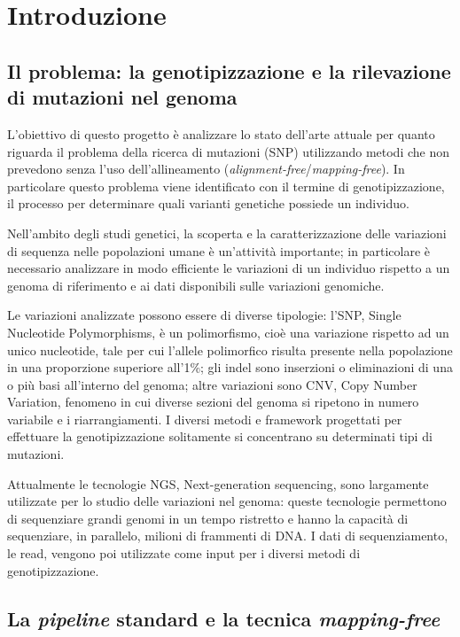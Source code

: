 \documentclass[../main.tex]{subfiles}
\begin{document}
\section{Introduzione}

\subsection{Il problema: la genotipizzazione e la rilevazione di mutazioni nel genoma}

L'obiettivo di questo progetto è analizzare lo stato dell'arte attuale per quanto riguarda il problema della ricerca di mutazioni (SNP) utilizzando metodi che non prevedono senza l'uso dell'allineamento (\textit{alignment-free}/\textit{mapping-free}). In particolare questo problema viene identificato con il termine di genotipizzazione, il processo per determinare quali varianti genetiche possiede un individuo.


Nell'ambito degli studi genetici, la scoperta e la caratterizzazione delle variazioni di sequenza nelle popolazioni umane è un'attività importante; in particolare è necessario analizzare in modo efficiente le variazioni di un individuo rispetto a un genoma di riferimento e ai dati disponibili sulle variazioni genomiche. 


Le variazioni analizzate possono essere di diverse tipologie: l'SNP, Single Nucleotide Polymorphisms, è un polimorfismo, cioè una variazione rispetto ad un unico nucleotide, tale per cui l'allele polimorfico risulta presente nella popolazione in una proporzione superiore all'1\%; gli indel sono inserzioni o eliminazioni di una o più basi all'interno del genoma; altre variazioni sono CNV, Copy Number Variation, fenomeno in cui diverse sezioni del genoma si ripetono in numero variabile e i riarrangiamenti. I diversi metodi e framework progettati per effettuare la genotipizzazione solitamente si concentrano su determinati tipi di mutazioni.


Attualmente le tecnologie NGS, Next-generation sequencing, sono largamente utilizzate per lo studio delle variazioni nel genoma: queste tecnologie permettono di sequenziare grandi genomi in un tempo ristretto e hanno la capacità di sequenziare, in parallelo, milioni di frammenti di DNA. I dati di sequenziamento, le read, vengono poi utilizzate come input per i diversi metodi di genotipizzazione.



\subsection{La \textit{pipeline} standard e la tecnica \textit{mapping-free}}
\end{document}

